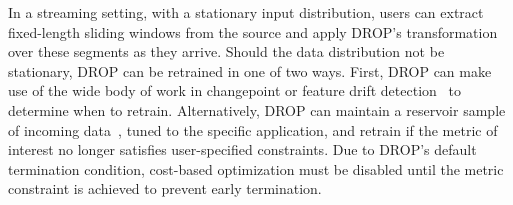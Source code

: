 



In a streaming setting, with a stationary input distribution, users can extract fixed-length sliding windows from the source and apply DROP's transformation over these segments as they arrive. 
Should the data distribution not be stationary, DROP can be retrained in one of two ways. 
First, DROP can make use of the wide body of work in changepoint or feature drift detection~\cite{cp1, cp2} to determine when to retrain. 
Alternatively, DROP can maintain a reservoir sample of incoming data~\cite{reservoir}, tuned to the specific application, and retrain if the metric of interest no longer satisfies user-specified constraints. 
Due to DROP's default termination condition, cost-based optimization must be disabled until the metric constraint is achieved to prevent early termination.




